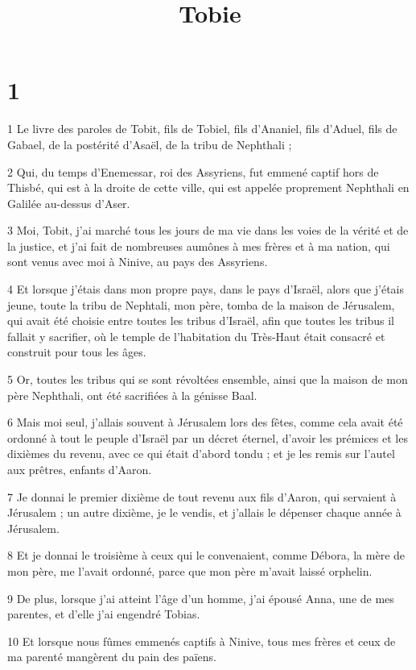 

\title{Tobie}


\chapter{1}

\par 1 Le livre des paroles de Tobit, fils de Tobiel, fils d'Ananiel, fils d'Aduel, fils de Gabael, de la postérité d'Asaël, de la tribu de Nephthali ;
\par 2 Qui, du temps d'Enemessar, roi des Assyriens, fut emmené captif hors de Thisbé, qui est à la droite de cette ville, qui est appelée proprement Nephthali en Galilée au-dessus d'Aser.
\par 3 Moi, Tobit, j'ai marché tous les jours de ma vie dans les voies de la vérité et de la justice, et j'ai fait de nombreuses aumônes à mes frères et à ma nation, qui sont venus avec moi à Ninive, au pays des Assyriens.
\par 4 Et lorsque j'étais dans mon propre pays, dans le pays d'Israël, alors que j'étais jeune, toute la tribu de Nephtali, mon père, tomba de la maison de Jérusalem, qui avait été choisie entre toutes les tribus d'Israël, afin que toutes les tribus il fallait y sacrifier, où le temple de l'habitation du Très-Haut était consacré et construit pour tous les âges.
\par 5 Or, toutes les tribus qui se sont révoltées ensemble, ainsi que la maison de mon père Nephthali, ont été sacrifiées à la génisse Baal.
\par 6 Mais moi seul, j'allais souvent à Jérusalem lors des fêtes, comme cela avait été ordonné à tout le peuple d'Israël par un décret éternel, d'avoir les prémices et les dixièmes du revenu, avec ce qui était d'abord tondu ; et je les remis sur l'autel aux prêtres, enfants d'Aaron.
\par 7 Je donnai le premier dixième de tout revenu aux fils d'Aaron, qui servaient à Jérusalem ; un autre dixième, je le vendis, et j'allais le dépenser chaque année à Jérusalem.
\par 8 Et je donnai le troisième à ceux qui le convenaient, comme Débora, la mère de mon père, me l'avait ordonné, parce que mon père m'avait laissé orphelin.
\par 9 De plus, lorsque j'ai atteint l'âge d'un homme, j'ai épousé Anna, une de mes parentes, et d'elle j'ai engendré Tobias.
\par 10 Et lorsque nous fûmes emmenés captifs à Ninive, tous mes frères et ceux de ma parenté mangèrent du pain des païens.
